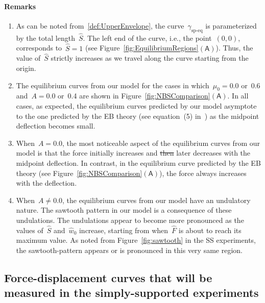 \documentclass[preprint,10pt,times]{elsarticle}
\numberwithin{equation}{section}
\newcommand{\pr}[1]{\left( #1 \right)}
\newcommand{\subf}[1]{\pr{\textsf{#1}}}
\begin{document}
\paragraph{Remarks}
\begin{enumerate}
\item \label{enu:Remark1}As can be noted from~\eqref{def:UpperEnvelope},
the curve~$\gamma_{\text{sp-eq}}$ is parameterized by the total
length~$\hat{S}$. The left end of the curve, i.e., the point~$(0,0)$,
corresponds to~$\hat{S}=1$ (see Figure~\ref{fig:EquilibriumRegions}$\subf{A}$).
Thus, the value of~$\hat{S}$ strictly increases as we travel along
the curve starting from the origin.
\item The equilibrium curves from our model for the cases in which~$\mu_0=0.0$
or~0.6 and~$A=0.0$ or~0.4 are shown in Figure~\ref{fig:NBSComparison}$\subf{A}$.
In all cases, as expected, the equilibrium curves predicted by our
model asymptote to the one predicted by the EB theory (see equation~(5) in~\cite{Sayaka2021Sawtooth}) as the midpoint
deflection becomes small.
\item When~$A=0.0$, the most noticeable aspect of the equilibrium curves
from our model is that the force initially increases and \sout{then }later
decreases with the midpoint deflection. In contrast, in the equilibrium
curve predicted by the EB theory (see Figure~\ref{fig:NBSComparison}$\subf{A}$),
the force always increases with the deflection.
\item When~$A\neq0.0$, the equilibrium curves from our model have an undulatory
nature. The sawtooth pattern in our model is a consequence of these
undulations. The undulations appear to become more pronounced as the
values of~$\hat{S}$ and~$\hat{w}_0$ increase, starting from when~$\hat{F}$
is about to reach its maximum value. As noted from Figure~\ref{fig:sawtooth}
in the SS experiments, the sawtooth-pattern appears or is pronounced
in this very same region.
\end{enumerate}

\subsection{Force-displacement curves that will be measured in the simply-supported
experiments\label{subsec:Force-displacement-curves-that}}
\end{document}

